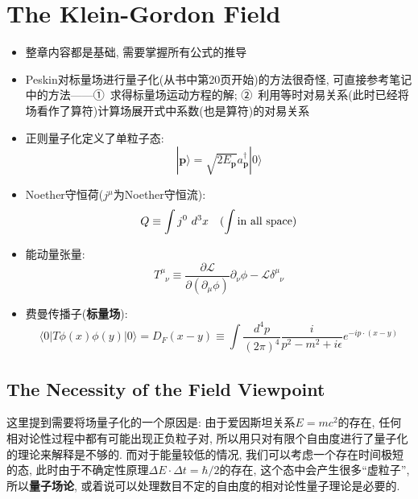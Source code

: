 \chapter{The Klein-Gordon Field}

\begin{itemize}
  \item 整章内容都是基础, 需要掌握所有公式的推导
  \item Peskin对标量场进行量子化(从书中第20页开始)的方法很奇怪, 可直接参考笔记中的方法——①\ 求得标量场运动方程的解; ②\ 利用等时对易关系(此时已经将场看作了算符)计算场展开式中系数(也是算符)的对易关系
  \item 正则量子化定义了单粒子态:
        \begin{equation*}
          |\mathbf{p}\rangle = \sqrt{2E_{\mathbf{p}}}a^{\dagger}_{\mathbf{p}}|0\rangle
        \end{equation*}
  \item Noether守恒荷($j^\mu$为Noether守恒流):
        \begin{equation*}
          Q \equiv \int j^0\ d^3x \quad (\int {\rm in\ all\ space})
        \end{equation*}
  \item 能动量张量:
        \begin{equation*}
          T^{\mu}_{\phantom{\mu}\nu}\equiv \frac{\partial \mathcal{L}}{\partial (\partial_{\mu} \phi)} \partial_{\nu} \phi - \mathcal{L}\delta^{\mu}_{\phantom{\mu}\nu}
        \end{equation*}
  \item 费曼传播子(\textbf{标量场}):
        \begin{equation*}
          \langle 0|T\phi(x)\phi(y)|0 \rangle = D_F(x-y)\equiv \int \frac{d^4 p}{(2\pi)^4} \frac{i}{p^2 - m^2 +i\epsilon} e^{-ip\cdot (x-y)}
        \end{equation*}
\end{itemize}
\pagestyle{general}

\section{The Necessity of the Field Viewpoint}

这里提到需要将场量子化的一个原因是: 由于爱因斯坦关系$E = mc^2$的存在, 任何相对论性过程中都有可能出现正负粒子对, 所以用只对有限个自由度进行了量子化的理论来解释是不够的.
而对于能量较低的情况, 我们可以考虑一个存在时间极短的态, 此时由于不确定性原理$\Delta E \cdot \Delta t = \hbar /2$的存在, 这个态中会产生很多“虚粒子”, 所以\textbf{量子场论}, 或着说可以处理数目不定的自由度的相对论性量子理论是必要的.

